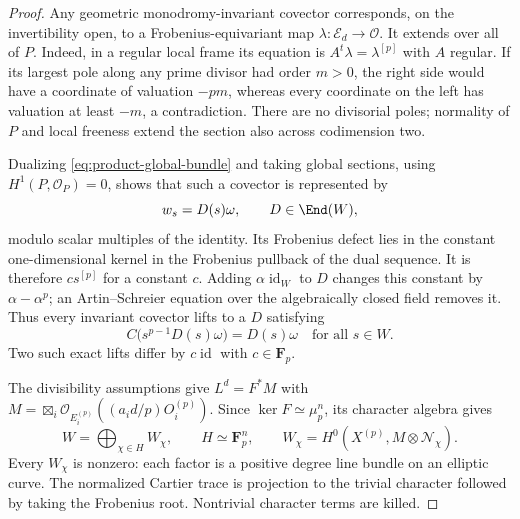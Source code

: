 \begin{proof}
Any geometric monodromy-invariant covector corresponds,
on the invertibility open, to a Frobenius-equivariant
map $\lambda:\mathcal E_d\to\mathcal O$.
It extends over all of $P$.  Indeed, in a regular local
frame its equation is $A^t\lambda=\lambda^{[p]}$ with
$A$ regular.  If its largest pole along any prime
divisor had order $m>0$, the right side would have
a coordinate of valuation $-pm$, whereas every coordinate
on the left has valuation at least $-m$, a contradiction.
There are no divisorial poles; normality of $P$ and local
freeness extend the section also across codimension two.

Dualizing \eqref{eq:product-global-bundle} and taking
global sections, using $H^1(P,\mathcal O_P)=0$, shows
that such a covector is represented by
\begin{equation}\label{eq:product-linear-lift}
 w_s=D(s)\omega,\qquad D\in\End(W),
\end{equation}
modulo scalar multiples of the identity.
Its Frobenius defect lies in the constant one-dimensional
kernel in the Frobenius pullback of the dual sequence.
It is therefore $c s^{[p]}$ for a constant $c$.
Adding $\alpha\operatorname{id}_W$ to $D$ changes this
constant by $\alpha-\alpha^p$; an Artin--Schreier equation
over the algebraically closed field removes it.
Thus every invariant covector lifts to a $D$ satisfying
\begin{equation}\label{eq:product-exact-Cartier-operator}
 C\bigl(s^{p-1}D(s)\omega\bigr)=D(s)\omega
            \quad\text{for all }s\in W.
\end{equation}
Two such exact lifts differ by $c\operatorname{id}$
with $c\in\mathbf F_p$.

The divisibility assumptions give
$L^d=F^*M$ with
$M=\boxtimes_i\mathcal O_{E_i^{(p)}}((a_i d/p)O_i^{(p)})$.
Since $\ker F\simeq\mu_p^n$, its character algebra gives
\begin{equation}\label{eq:product-character-W}
 W=\bigoplus_{\chi\in H}W_\chi,
 \qquad H\simeq\mathbf F_p^n,
 \qquad W_\chi=H^0(X^{(p)},M\otimes\mathcal N_\chi).
\end{equation}
Every $W_\chi$ is nonzero: each factor is a positive
degree line bundle on an elliptic curve.
The normalized Cartier trace is projection to the
trivial character followed by taking the Frobenius
root.  Nontrivial character terms are killed.


\end{proof}
